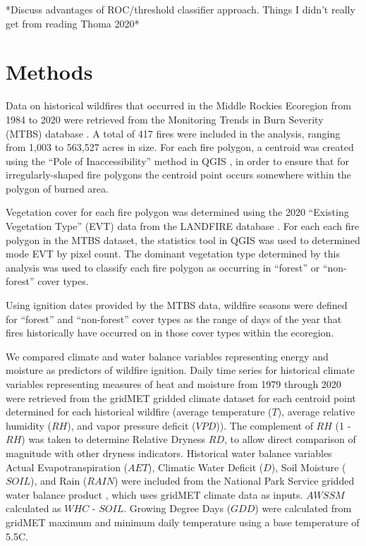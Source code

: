 \documentclass{article}
\begin{document}
*Discuss advantages of ROC/threshold classifier approach.  Things I didn't really get from reading Thoma 2020*

\section{Methods}

Data on historical wildfires that occurred in the Middle Rockies Ecoregion from 1984 to 2020 were retrieved from the Monitoring Trends in Burn Severity (MTBS) database \citep{eidenshinkProjectMonitoringTrends2007}.  A total of 417 fires were included in the analysis, ranging from 1,003 to 563,527 acres in size.  For each fire polygon, a centroid was created using the ``Pole of Inaccessibility'' method in QGIS \citep{QGIS_software}, in order to ensure that for irregularly-shaped fire polygons the centroid point occurs somewhere within the polygon of burned area.  

Vegetation cover for each fire polygon was determined using the 2020 ``Existing Vegetation Type'' (EVT) data from the LANDFIRE database \citep{rollinsLANDFIRENationallyConsistent2009}.  For each each fire polygon in the MTBS dataset, the statistics tool in QGIS was used to determined mode EVT by pixel count.  The dominant vegetation type determined by this analysis was used to classify each fire polygon as occurring in ``forest'' or ``non-forest'' cover types.  

Using ignition dates provided by the MTBS data, wildfire seasons were defined for ``forest'' and ``non-forest'' cover types as the range of days of the year that fires historically have occurred on in those cover types within the ecoregion.

We compared climate and water balance variables representing energy and moisture as predictors of wildfire ignition.  Daily time series for historical climate variables representing measures of heat and moisture from 1979 through 2020 were retrieved from the gridMET gridded climate dataset \citep{abatzoglouDevelopmentGriddedSurface2013} for each centroid point determined for each historical wildfire (average temperature ($T$), average relative humidity ($RH$), and vapor pressure deficit ($VPD$)).  The complement of $RH$ (1 - $RH$) was taken to determine Relative Dryness $RD$, to allow direct comparison of magnitude with other dryness indicators. Historical water balance variables Actual Evapotranspiration ($AET$), Climatic Water Deficit ($D$), Soil Moisture ($SOIL$), and Rain ($RAIN$) were included from the National Park Service gridded water balance product \citep{tercekHistoricalChangesPlant2021}, which uses gridMET climate data as inputs.  $AWSSM$ calculated as $WHC$ - $SOIL$.  Growing Degree Days ($GDD$) were calculated from gridMET maximum and minimum daily temperature using a base temperature of 5.5\degree C.
\end{document}
